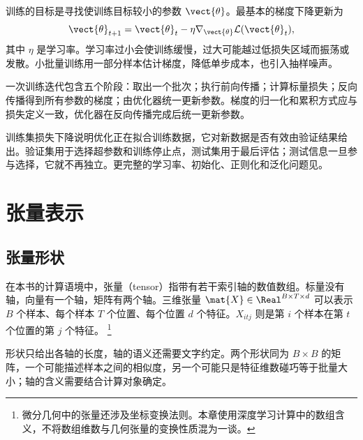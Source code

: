 \documentclass[../textbook.tex]{subfiles}
\begin{document}
训练的目标是寻找使训练目标较小的参数 $\vect{\theta}$。最基本的梯度下降更新为
\begin{equation}
 \vect{\theta}_{t+1}=\vect{\theta}_t-\eta\nabla_{\vect{\theta}}\mathcal L(\vect{\theta}_t),
\end{equation}
其中 $\eta$ 是学习率。学习率过小会使训练缓慢，过大可能越过低损失区域而振荡或发散。小批量训练用一部分样本估计梯度，降低单步成本，也引入抽样噪声。

一次训练迭代包含五个阶段：取出一个批次；执行前向传播；计算标量损失；反向传播得到所有参数的梯度；由优化器统一更新参数。梯度的归一化和累积方式应与损失定义一致，优化器在反向传播完成后统一更新参数。

训练集损失下降说明优化正在拟合训练数据，它对新数据是否有效由验证结果给出。验证集用于选择超参数和训练停止点，测试集用于最后评估；测试信息一旦参与选择，它就不再独立。更完整的学习率、初始化、正则化和泛化问题见。

\section{张量表示}

\subsection{张量形状}
\begin{definition}[计算语境中的张量]
在本书的计算语境中，张量（tensor）指带有若干索引轴的数值数组。标量没有轴，向量有一个轴，矩阵有两个轴。三维张量 $\mat{X}\in\Real^{B\times T\times d}$ 可以表示 $B$ 个样本、每个样本 $T$ 个位置、每个位置 $d$ 个特征。$X_{itj}$ 则是第 $i$ 个样本在第 $t$ 个位置的第 $j$ 个特征。
\footnote{微分几何中的张量还涉及坐标变换法则。本章使用深度学习计算中的数组含义，不将数组维数与几何张量的变换性质混为一谈。}
\end{definition}
形状只给出各轴的长度，轴的语义还需要文字约定。两个形状同为 $B\times B$ 的矩阵，一个可能描述样本之间的相似度，另一个可能只是特征维数碰巧等于批量大小；轴的含义需要结合计算对象确定。
\end{document}

